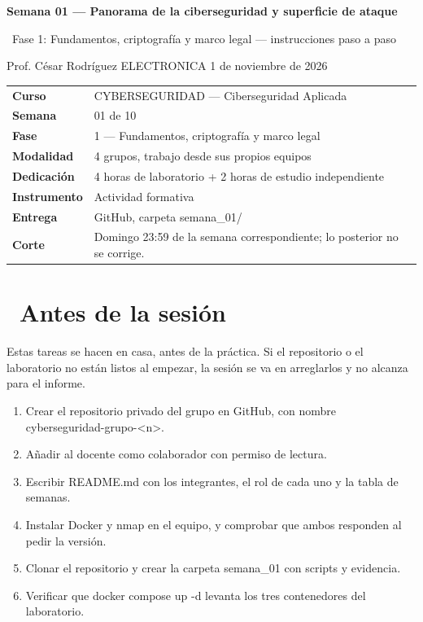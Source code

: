\documentclass[11pt,a4paper]{article}
\newcommand{\iconoBanda}{microchip}
\newcommand{\bandaTitulo}[3][fondoOscuro]{%
  \begin{tcolorbox}[
    enhanced,
    colback=#1, colframe=#1,
    boxrule=0pt, arc=8pt, outer arc=8pt,
    width=\linewidth,
    top=18pt, bottom=6pt, left=14pt, right=14pt,
    borderline south={3.5pt}{0pt}{cyanNeon},
  ]
    \begin{minipage}[c]{0.07\linewidth}
      \centering
      \textcolor{cyanNeon}{\fontsize{30}{30}\selectfont\faIcon{\iconoBanda}}
    \end{minipage}%
    \hspace{8pt}%
    \begin{minipage}[c]{0.88\linewidth}
      {\fontsize{20}{24}\selectfont\bfseries\color{white}#2}\par\vspace{5pt}%
      \textcolor{cyanNeon!80!white}{\small\faIcon{angle-right}~#3}%
    \end{minipage}
    \vspace{4pt}
  \end{tcolorbox}%
  \vspace{8pt}%
}
\newcommand{\iconotexto}[2]{\textcolor{cyanNeon}{\faIcon{#1}}~#2}
\renewcommand{\iconoBanda}{shield-alt}
\begin{document}
\bandaTitulo[fondoOscuro]{Semana 01 --- Panorama de la ciberseguridad y superficie de ataque}{Fase 1: Fundamentos, criptografía y marco legal --- instrucciones paso a paso}

\begin{center}\small\color{grisTexto}Prof. César Rodríguez \textbar{} ELECTRONICA \textbar{} 1 de noviembre de 2026\end{center}

\begin{tabularx}{\linewidth}{@{}>{\raggedright\arraybackslash}p{4.6cm}X@{}}
\toprule
\textbf{Curso} & CYBERSEGURIDAD --- Ciberseguridad Aplicada \\
\textbf{Semana} & 01 de 10 \\
\textbf{Fase} & 1 --- Fundamentos, criptografía y marco legal \\
\textbf{Modalidad} & 4 grupos, trabajo desde sus propios equipos \\
\textbf{Dedicación} & 4 horas de laboratorio + 2 horas de estudio independiente \\
\textbf{Instrumento} & Actividad formativa \\
\textbf{Entrega} & GitHub, carpeta semana\_01/ \\
\textbf{Corte} & Domingo 23:59 de la semana correspondiente; lo posterior no se corrige. \\
\bottomrule
\end{tabularx}

\section{\iconotexto{clock}{Antes de la sesión}}

Estas tareas se hacen en casa, antes de la práctica. Si el repositorio o el laboratorio no están listos al empezar, la sesión se va en arreglarlos y no alcanza para el informe.

\begin{enumerate}[leftmargin=1.4em,itemsep=2pt,topsep=3pt]
  \item Crear el repositorio privado del grupo en GitHub, con nombre cyberseguridad-grupo-\textless{}n\textgreater{}.
  \item Añadir al docente como colaborador con permiso de lectura.
  \item Escribir README.md con los integrantes, el rol de cada uno y la tabla de semanas.
  \item Instalar Docker y nmap en el equipo, y comprobar que ambos responden al pedir la versión.
  \item Clonar el repositorio y crear la carpeta semana\_01 con scripts y evidencia.
  \item Verificar que docker compose up -d levanta los tres contenedores del laboratorio.
\end{enumerate}
\end{document}
